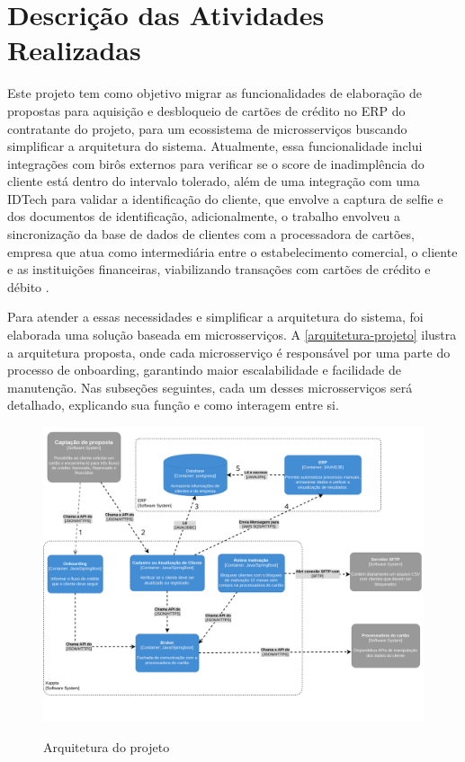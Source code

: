 \chapter{Descrição das Atividades Realizadas}
\label{cap:atividades}

Este projeto tem como objetivo migrar as funcionalidades de elaboração de propostas para 
aquisição e desbloqueio de cartões de crédito no ERP
do contratante do projeto, para um ecossistema de microsserviços buscando simplificar 
a arquitetura do sistema. Atualmente, essa funcionalidade inclui integrações com 
birôs externos para verificar se o score de inadimplência do cliente está dentro do 
intervalo tolerado, além de uma integração com uma IDTech para validar a identificação 
do cliente, que envolve a captura de selfie e dos documentos de identificação, adicionalmente, 
o trabalho envolveu a sincronização da base de dados de clientes com a processadora de cartões, empresa que atua como 
intermediária entre o estabelecimento comercial, o cliente e as instituições financeiras, viabilizando transações com 
cartões de crédito e débito \cite{processadora-cartao:explicacao}.

Para atender a essas necessidades e simplificar a arquitetura do sistema, 
foi elaborada uma solução baseada em microsserviços. 
A \autoref{arquitetura-projeto} ilustra a arquitetura proposta, 
onde cada microsserviço é responsável por uma parte do processo de onboarding, 
garantindo maior escalabilidade e facilidade de manutenção. Nas subseções seguintes, 
cada um desses microsserviços será detalhado, explicando sua 
função e como interagem entre si.


\begin{figure} [!h]
    \centering
    \caption{Arquitetura do projeto}
    \includegraphics[width=1\textwidth]{arquivos/imagens/arquitetura-relatorio-estagio.pdf}
    \label{arquitetura-projeto}
\end{figure}

